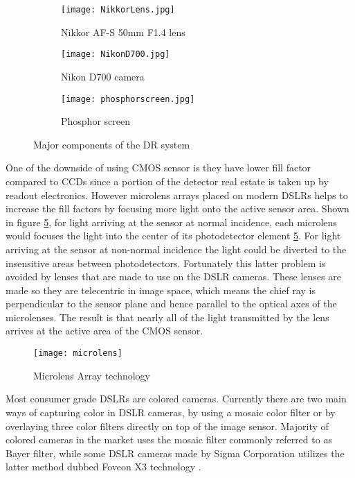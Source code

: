 \begin{figure}[ht]
	\begin{subfigure}[b]{0.3\linewidth}
		\centering
		\texttt{[image: NikkorLens.jpg]}
		\caption{Nikkor AF-S 50mm F1.4 lens}
		\label{fig:nikonlens}
	\end{subfigure}
	\hspace{0.2cm}
	\begin{subfigure}[b]{0.3\linewidth}
		\centering
		\texttt{[image: NikonD700.jpg]}
		\caption{Nikon D700 camera}
		\label{fig:nikoncamera}
	\end{subfigure}
	\hspace{0.2cm}
	\begin{subfigure}[b]{0.3\linewidth}
		\texttt{[image: phosphorscreen.jpg]}
		\caption{Phosphor screen}
		\label{fig:phosphorscreen}
	\end{subfigure}
\caption{Major components of the DR system}
\label{fig:DRcomponents}
\end{figure}

One of the downside of using CMOS sensor is they have lower fill factor compared to CCDs since a portion of the detector real estate is taken up by readout electronics.  However microlens arrays placed on modern DSLRs helps to increase the fill factors by focusing more light onto the active sensor area.  Shown in figure \ref{fig:microlensarray}, for light arriving at the sensor at normal incidence, each microlens would focuses the light into the center of its photodetector element \ref{fig:microlensarray}.  For light arriving at the sensor at non-normal incidence the light could be diverted to the insensitive areas between photodetectors.  Fortunately this latter problem is avoided by lenses that are made to use on the DSLR cameras.  These lenses are made so they are telecentric in image space, which means the chief ray is perpendicular to the sensor plane and hence parallel to the optical axes of the microlenses.  The result is that nearly all of the light transmitted by the lens arrives at the active area of the CMOS sensor.

\begin{figure}
\centering
\texttt{[image: microlens]}
\caption{Microlens Array technology}
\label{fig:microlensarray}
\end{figure}

Most consumer grade DSLRs are colored cameras.  Currently there are two main ways of capturing color in DSLR cameras, by using a mosaic color filter or by overlaying three color filters directly on top of the image sensor.  Majority of colored cameras in the market uses the mosaic filter commonly referred to as Bayer filter, while some DSLR cameras made by Sigma Corporation utilizes the latter method dubbed Foveon X3 technology \cite{foveon}.  

